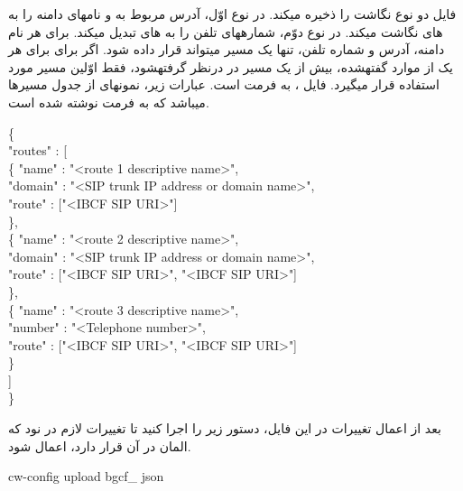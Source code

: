 فایل  دو نوع نگاشت را ذخیره می\nf کند. در نوع اوّل، آدرس  مربوط به  و نام\nf های دامنه را به های  نگاشت می\nf کند. در نوع دوّم، شماره\nf های تلفن را به های  تبدیل می\nf کند. برای هر نام دامنه،  آدرس  و شماره تلفن، تنها یک مسیر می\nf تواند قرار داده شود. اگر برای  برای هر یک از موارد گفته\nf شده، بیش از یک مسیر در درنظر گرفته\nf شود، فقط اوّلین مسیر مورد استفاده قرار می\nf گیرد. فایل ، به فرمت  است. عبارات زیر، نمونه\nf ای از جدول مسیرها می\nf باشد که به فرمت  نوشته شده است.
\begin{latin}
\setlength{\parindent}{0ex}
\{\\
\hspace*{1cm}"routes" : [\\
\hspace*{1.5cm}\{\hspace{0.25cm}    "name" : "<route 1 descriptive name>",\\
\hspace*{2cm}"domain" : "<SIP trunk IP address or domain name>",\\
\hspace*{2cm}"route" : ["<IBCF SIP URI>"]\\
\hspace*{1.5cm}\},\\
\hspace*{1.5cm}\{\hspace{0.25cm}   "name" : "<route 2 descriptive name>",\\
\hspace*{2cm}"domain" : "<SIP trunk IP address or domain name>",\\
\hspace*{2cm}"route" : ["<IBCF SIP URI>", "<IBCF SIP URI>"]\\
\hspace*{1.5cm}\},\\
\hspace*{1.5cm}\{ \hspace{0.25cm}   "name" : "<route 3 descriptive name>",\\
\hspace*{2cm}"number" : "<Telephone number>",\\
\hspace*{2cm}"route" : ["<IBCF SIP URI>", "<IBCF SIP URI>"]\\
\hspace*{1.5cm}\}\\
\hspace*{1cm}]\\
\} \\
\end{latin}
\noindent بعد از اعمال تغییرات در این فایل، دستور زیر را اجرا کنید تا تغییرات لازم در نود  که المان  در آن قرار دارد، اعمال شود.
\begin{latin}
\noindent cw-config upload bgcf\_ json
\end{latin}
